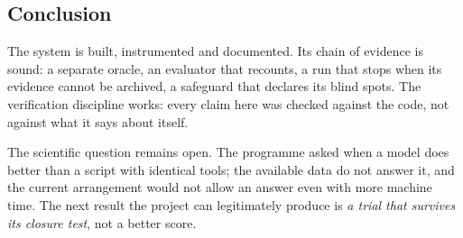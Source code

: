 \begin{samepage}
\section{Conclusion}

The system is built, instrumented and documented. Its chain of evidence is sound:
a separate oracle, an evaluator that recounts, a run that stops when its evidence
cannot be archived, a safeguard that declares its blind spots. The verification discipline works: every claim here was checked against the code,
not against what it says about itself.

The scientific question remains open. The programme asked when a model does better
than a script with identical tools; the available data do not answer it, and the
current arrangement would not allow an answer even with more machine time. The
next result the project can legitimately produce is \emph{a trial that survives its
closure test}, not a better score.
\end{samepage}
